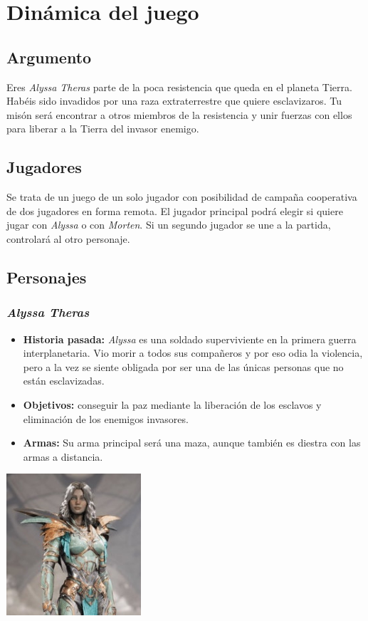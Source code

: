 \documentclass[11pt, twoside]{article}
\begin{document}
\pagestyle{insection}
\section{Dinámica del juego}


\subsection{Argumento}
Eres \textit{Alyssa Theras} parte de la poca resistencia que queda en el planeta Tierra. Habéis sido invadidos por una raza extraterrestre que quiere esclavizaros. Tu misón será encontrar a otros miembros de la resistencia y unir fuerzas con ellos para liberar a la Tierra del invasor enemigo. 

\subsection{Jugadores}
Se trata de un juego de un solo jugador con posibilidad de campaña cooperativa de dos jugadores en forma remota. El jugador principal podrá elegir si quiere jugar con \textit{Alyssa} o con \textit{Morten}. Si un segundo jugador se une a la partida, controlará al otro personaje.

\newpage

\pagestyle{insection}
\subsection{Personajes}

\subsubsection{\textit{Alyssa Theras}}
\begin{itemize}
\item \textbf{Historia pasada:} \textit{Alyssa} es una soldado superviviente en la primera guerra interplanetaria. Vio morir a todos sus compañeros y por eso odia la violencia, pero a la vez se siente obligada por ser una de las únicas personas que no están esclavizadas. 
\item \textbf{Objetivos:} conseguir la paz mediante la liberación de los esclavos y eliminación de los enemigos invasores.
\item \textbf{Armas:} Su arma principal será una maza, aunque también es diestra con las armas a distancia. 
\end{itemize}

\begin{center}
\includegraphics[width=5cm]{./images/alyssa.jpg}
\end{center}
\end{document}
